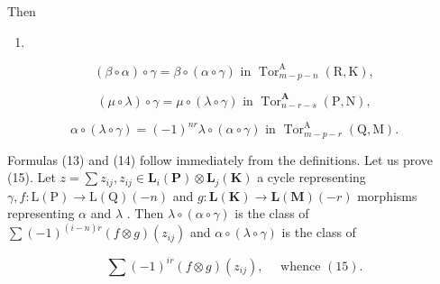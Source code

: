 Then

\begin{enumerate}
\def\labelenumi{(\arabic{enumi})}
\setcounter{enumi}{12}
\tightlist
\item
\end{enumerate}

\[
(\beta \circ \alpha) \circ \gamma = \beta \circ (\alpha \circ \gamma) \text { in }\operatorname{Tor} _ {m - p - n} ^ {\mathrm{A}} (\mathrm{R}, \mathrm{K}),\tag{14}
\]

\[
(\mu \circ \lambda) \circ \gamma = \mu \circ (\lambda \circ \gamma) \text { in }\operatorname{Tor} _ {n - r - s} ^ {\mathbf {A}} (\mathrm{P}, \mathrm{N}),\tag{15}
\]

\[
\alpha \circ (\lambda \circ \gamma) = (- 1) ^ {n r} \lambda \circ (\alpha \circ \gamma) \text { in }\operatorname{Tor} _ {m - p - r} ^ {\mathrm{A}} (\mathrm{Q}, \mathrm{M}).
\]

Formulas (13) and (14) follow immediately from the definitions. Let us prove (15). Let \(z = \sum z_{ij}, z_{ij} \in \mathbf{L}_i(\mathbf{P}) \otimes \mathbf{L}_j(\mathbf{K})\) a cycle representing \(\gamma, f: \mathrm{L}(\mathrm{P}) \to \mathrm{L}(\mathrm{Q})(-n)\) and \(g: \mathbf{L}(\mathbf{K}) \to \mathbf{L}(\mathbf{M})(-r)\) morphisms representing \(\alpha\) and \(\lambda\) . Then \(\lambda \circ (\alpha \circ \gamma)\) is the class of \(\sum (-1)^{(i-n)r}(f \otimes g)(z_{ij})\) and \(\alpha \circ (\lambda \circ \gamma)\) is the class of

\[
\sum (- 1) ^ {i r} (f \otimes g) (z _ {i j}), \quad \text { whence } (1 5).
\]

